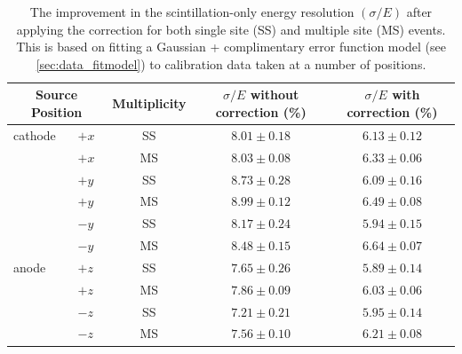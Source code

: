 \documentclass[herrin-thesis.tex]{subfiles}
\begin{document}
\begin{table}[tbh]
\centering
\caption[Resolution improvement due to correction]{The improvement in the scintillation-only energy resolution \((\sigma/E)\) after applying the correction for both single site (SS) and multiple site (MS) events. This is based on fitting a Gaussian + complimentary error function model (see \ref{sec:data_fitmodel}) to  calibration data taken at a number of positions.}
\label{tab:lightmap_effect}
\begin{tabular}{l l c c c}\toprule
\multicolumn{2}{c}{Source Position}	&	Multiplicity	&	\(\sigma/E\) without correction (\%)	&	\(\sigma/E\) with correction (\%)		\\\midrule
cathode	&	\(+x\)				&	SS			&	\(8.01\pm0.18\)					&	\(6.13\pm0.12\)					\\
		&	\(+x\)				&	MS			&	\(8.03\pm0.08\)					&	\(6.33\pm0.06\)					\\
		&	\(+y\)				&	SS			&	\(8.73\pm0.28\)					&	\(6.09\pm0.16\)					\\
		&	\(+y\)				&	MS			&	\(8.99\pm0.12\)					&	\(6.49\pm0.08\)					\\
		&	\(-y\)				&	SS			&	\(8.17\pm0.24\)					&	\(5.94\pm0.15\)					\\
		&	\(-y\)				&	MS			&	\(8.48\pm0.15\)					&	\(6.64\pm0.07\)					\\
anode	&	\(+z\)				&	SS			&	\(7.65\pm0.26\)					&	\(5.89\pm0.14\)					\\
		&	\(+z\)				&	MS			&	\(7.86\pm0.09\)					&	\(6.03\pm0.06\)					\\
		&	\(-z\)				&	SS			&	\(7.21\pm0.21\)					&	\(5.95\pm0.14\)					\\
		&	\(-z\)				&	MS			&	\(7.56\pm0.10\)					&	\(6.21\pm0.08\)					\\\bottomrule
\end{tabular}
\end{table}
\end{document}
